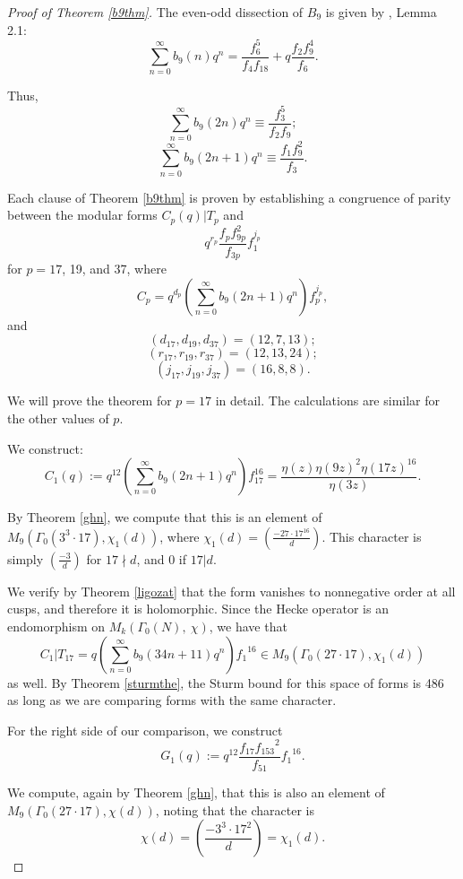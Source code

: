 \documentclass[12pt]{amsart}
\theoremstyle{definition}
\begin{document}
\begin{proof}[Proof of Theorem \ref{b9thm}] The even-odd dissection of $B_9$ is given by \cite{xiayao9}, Lemma 2.1: $$\sum_{n=0}^\infty b_9(n) q^n = \frac{f_6^5}{f_4 f_{18}} + q \frac{f_2 f_9^4}{f_6}.$$

Thus,
$$\sum_{n=0}^\infty b_9(2n) q^n \equiv \frac{f_3^5}{f_2 f_9};$$
$$\sum_{n=0}^\infty b_9(2n+1) q^n \equiv \frac{f_1 f_9^2}{f_3}.$$

Each clause of Theorem \ref{b9thm} is proven by establishing a congruence of parity between the modular forms $C_p(q) \vert T_p$ and $$q^{r_p} \frac{f_p f_{9p}^2}{f_{3p}} f_1^{j_p}$$ for $p = 17$, 19, and 37, where $$C_p = q^{d_p} \left( \sum_{n=0}^\infty b_9(2n+1)q^n \right) f_p^{j_p},$$
and
$$(d_{17},d_{19},d_{37}) = (12,7,13);$$
\begin{equation}\label{drj}
(r_{17},r_{19},r_{37}) = (12,13,24);
\end{equation}
$$(j_{17},j_{19},j_{37}) = (16,8,8).$$

We will prove the theorem for $p=17$ in detail.  The calculations are similar for the other values of $p$.

We construct:
$$C_1(q) := q^{12} \left( \sum_{n=0}^\infty b_9(2n+1) q^n \right) f_{17}^{16} = \frac{\eta(z) \eta(9z)^2\eta(17z)^{16}}{\eta(3z)}.$$

By Theorem \ref{ghn}, we compute that this is an element of $M_9 (\Gamma_0(3^3 \cdot 17), \chi_1(d) )$, where $\chi_1(d) = \left( \frac{-27 \cdot 17^{16}}{d} \right)$.  This character is simply $\left( \frac{-3}{d} \right)$ for $17 \nmid d$, and 0 if $17 \vert d$.

We verify by Theorem \ref{ligozat} that the form vanishes to nonnegative order at all cusps, and therefore it is holomorphic.  Since the Hecke operator is an endomorphism on $M_k(\Gamma_0(N),\ \chi)$, we have that $$C_1 \vert T_{17} = q \left( \sum_{n=0}^\infty b_9(34n+11) q^n \right) {f_1}^{16} \in M_9(\Gamma_0(27 \cdot 17), \chi_1(d) )$$ \noindent as well.  By Theorem \ref{sturmthe}, the Sturm bound for this space of forms is 486 as long as we are comparing forms with the same character.  

For the right side of our comparison, we construct $$G_1(q) := q^{12} \frac{f_{17} {f_{153}}^2}{f_{51}} {f_1}^{16}.$$

We compute, again by Theorem \ref{ghn}, that this is also an element of $M_9(\Gamma_0(27 \cdot 17), \chi(d) )$, noting that the character is
$$\chi (d) = \left(\frac{-3^3 \cdot 17^2}{d}\right) =\chi_1(d).$$


\end{proof}
\end{document}
